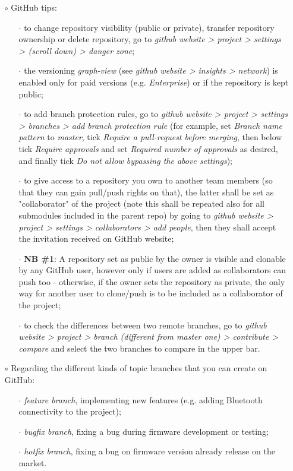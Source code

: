 \documentclass[a4paper,portrait,10pt]{article}   %
\newcommand{\mybulletlvA}{$\circ$}   %
\newcommand{\mybulletlvB}{$\cdot$}   %
\newcommand{\mysapo}[1]{\textquotesingle #1\textquotesingle }   %
\newcommand{\myparvspace}{\vspace{4mm}}   %
\newcommand{\mysecvspace}{\vspace{6mm}}   %
\begin{document}
\begin{itemize}
\item[\mybulletlvA] GitHub tips:
\begin{itemize}
  \item[\mybulletlvB] to change repository visibility (public or private), transfer repository ownership or delete repository, go to \textit{github website > project > settings > (scroll down) > danger zone};
  \item[\mybulletlvB] the versioning \textit{graph-view} (see \textit{github website > insights > network}) is enabled only for paid versions (e.g. \textit{Enterprise}) or if the repository is kept public;
  \item[\mybulletlvB] to add branch protection rules, go to \textit{github website > project > settings > branches > add branch protection rule} (for example, set \textit{Branch name pattern} to \textit{master}, tick \textit{Require a pull-request before merging}, then below tick \textit{Require approvals} and set \textit{Required number of approvals} as desired, and finally tick  \textit{Do not allow bypassing the above settings});
  \item[\mybulletlvB] to give access to a repository you own to another team members (so that they can gain pull/push rights on that), the latter shall be set as "collaborator" of the project (note this shall be repeated also for all submodules included in the parent repo) by going to \textit{github website > project > settings > collaborators > add people}, then they shall accept the invitation received on GitHub website;
  \item[\mybulletlvB] \textbf{NB \#1}: A repository set as public by the owner is visible and clonable by any GitHub user, however only if users are added as collaborators can push too - otherwise, if the owner sets the repository as private, the only way for another user to clone/push is to be included as a collaborator of the project;
  \item[\mybulletlvB] to check the differences between two remote branches, go to \textit{github website > project > branch (different from \mysapo{master} one) > contribute > compare} and select the two branches to compare in the upper bar.
\end{itemize}
\myparvspace

\item[\mybulletlvA] Regarding the different kinds of topic branches that you can create on GitHub:
\begin{itemize}
  \item[\mybulletlvB] \textit{feature branch}, implementing new features (e.g. adding Bluetooth connectivity to the project);
  \item[\mybulletlvB] \textit{bugfix branch}, fixing a bug during firmware development or testing;
  \item[\mybulletlvB] \textit{hotfix branch}, fixing a bug on firmware version already release on the market.
\end{itemize}
\end{itemize}
\mysecvspace
  
\end{document}

